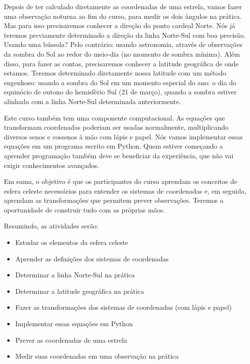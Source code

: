 Depois de ter calculado diretamente as coordenadas de uma estrela, vamos fazer uma observação noturna ao fim do curso, para medir os dois ângulos na prática. Mas para isso precisaremos conhecer a direção do ponto cardeal Norte. Nós já teremos previamente determinado a direção da linha Norte-Sul com boa precisão. Usando uma bússola? Pelo contrário: usando astronomia, através de observações da sombra do Sol ao redor do meio-dia (no momento de sombra mínima). Além disso, para fazer as contas, precisaremos conhecer a latitude geográfica de onde estamos. Teremos determinado diretamente nossa latitude com um método engenhoso: usando a sombra do Sol em um momento especial do ano: o dia do equinócio de outono do hemisfério Sul (21 de março), quando a sombra estiver alinhada com a linha Norte-Sul determinada anteriormente.

Este curso também tem uma componente computacional. As equações que transformam coordenadas poderiam ser usadas normalmente, multiplicando diversos senos e cossenos à mão com lápis e papel. Nós vamos implementar essas equações em um programa escrito em Python. Quem estiver começando a aprender programação também deve se beneficiar da experiência, que não vai exigir conhecimentos avançados.

Em suma, o objetivo é que os participantes do curso aprendam os conceitos de esfera celeste necessários para entender os sistemas de coordenadas e, em seguida, aprendam as transformações que permitem prever observações. Teremos a oportunidade de construir tudo com as próprias mãos.

Resumindo, as atividades serão:
\begin{itemize}
\setlength\itemsep{0.2em}
\item Estudar os elementos da esfera celeste
\item Aprender as definições dos sistemas de coordenadas
\item Determinar a linha Norte-Sul na prática
\item Determinar a latitude geográfica na prática
\item Fazer as transformações dos sistemas de coordenadas (com lápis e papel)
\item Implementar essas equações em Python
\item Prever as coordenadas de uma estrela
\item Medir suas coordenadas em uma observação na prática
\end{itemize}


